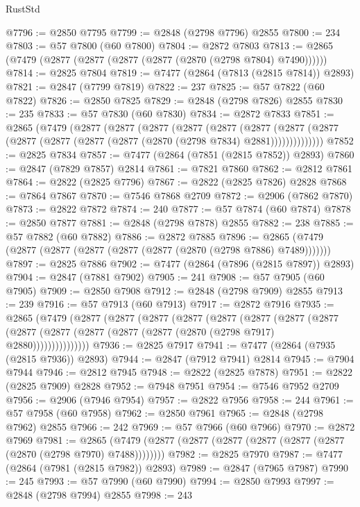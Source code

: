 \begin{lexlean}{RustStd}
\begin{coremodule}
@7796 := @2850 @7795
@7799 := @2848 (@2798 @7796) @2855
@7800 := 234
@7803 := @57 @7800 (@60 @7800)
@7804 := @2872 @7803
@7813 := @2865 (@7479 (@2877 (@2877 (@2877 (@2877 (@2870 (@2798 @7804) @7490))))))
@7814 := @2825 @7804
@7819 := @7477 (@2864 (@7813 (@2815 @7814)) @2893)
@7821 := @2847 (@7799 @7819)
@7822 := 237
@7825 := @57 @7822 (@60 @7822)
@7826 := @2850 @7825
@7829 := @2848 (@2798 @7826) @2855
@7830 := 235
@7833 := @57 @7830 (@60 @7830)
@7834 := @2872 @7833
@7851 := @2865
    (@7479
      (@2877
        (@2877
          (@2877
            (@2877
              (@2877
                (@2877
                  (@2877 (@2877 (@2877 (@2877 (@2877 (@2877 (@2870 (@2798 @7834) @2881))))))))))))))
@7852 := @2825 @7834
@7857 := @7477 (@2864 (@7851 (@2815 @7852)) @2893)
@7860 := @2847 (@7829 @7857) @2814
@7861 := @7821 @7860
@7862 := @2812 @7861
@7864 := @2822 (@2825 @7796)
@7867 := @2822 (@2825 @7826) @2828
@7868 := @7864 @7867
@7870 := @7546 @7868 @2709
@7872 := @2906 (@7862 @7870)
@7873 := @2822 @7872
@7874 := 240
@7877 := @57 @7874 (@60 @7874)
@7878 := @2850 @7877
@7881 := @2848 (@2798 @7878) @2855
@7882 := 238
@7885 := @57 @7882 (@60 @7882)
@7886 := @2872 @7885
@7896 := @2865 (@7479 (@2877 (@2877 (@2877 (@2877 (@2877 (@2870 (@2798 @7886) @7489)))))))
@7897 := @2825 @7886
@7902 := @7477 (@2864 (@7896 (@2815 @7897)) @2893)
@7904 := @2847 (@7881 @7902)
@7905 := 241
@7908 := @57 @7905 (@60 @7905)
@7909 := @2850 @7908
@7912 := @2848 (@2798 @7909) @2855
@7913 := 239
@7916 := @57 @7913 (@60 @7913)
@7917 := @2872 @7916
@7935 := @2865
    (@7479
      (@2877
        (@2877
          (@2877
            (@2877
              (@2877
                (@2877
                  (@2877
                    (@2877
                      (@2877 (@2877 (@2877 (@2877 (@2877 (@2870 (@2798 @7917) @2880)))))))))))))))
@7936 := @2825 @7917
@7941 := @7477 (@2864 (@7935 (@2815 @7936)) @2893)
@7944 := @2847 (@7912 @7941) @2814
@7945 := @7904 @7944
@7946 := @2812 @7945
@7948 := @2822 (@2825 @7878)
@7951 := @2822 (@2825 @7909) @2828
@7952 := @7948 @7951
@7954 := @7546 @7952 @2709
@7956 := @2906 (@7946 @7954)
@7957 := @2822 @7956
@7958 := 244
@7961 := @57 @7958 (@60 @7958)
@7962 := @2850 @7961
@7965 := @2848 (@2798 @7962) @2855
@7966 := 242
@7969 := @57 @7966 (@60 @7966)
@7970 := @2872 @7969
@7981 := @2865 (@7479 (@2877 (@2877 (@2877 (@2877 (@2877 (@2877 (@2870 (@2798 @7970) @7488))))))))
@7982 := @2825 @7970
@7987 := @7477 (@2864 (@7981 (@2815 @7982)) @2893)
@7989 := @2847 (@7965 @7987)
@7990 := 245
@7993 := @57 @7990 (@60 @7990)
@7994 := @2850 @7993
@7997 := @2848 (@2798 @7994) @2855
@7998 := 243

\end{coremodule}
\end{lexlean}
